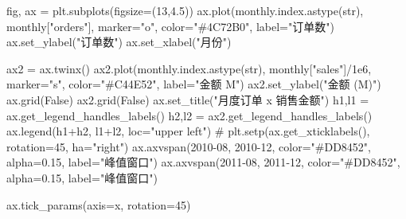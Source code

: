 \documentclass[
]{ctexart}
\newenvironment{Shaded}{\begin{snugshade}}{\end{snugshade}}
\newcommand{\BuiltInTok}[1]{\textcolor[rgb]{0.00,0.23,0.31}{#1}}
\newcommand{\CommentTok}[1]{\textcolor[rgb]{0.37,0.37,0.37}{#1}}
\newcommand{\DecValTok}[1]{\textcolor[rgb]{0.68,0.00,0.00}{#1}}
\newcommand{\FloatTok}[1]{\textcolor[rgb]{0.68,0.00,0.00}{#1}}
\newcommand{\NormalTok}[1]{\textcolor[rgb]{0.00,0.23,0.31}{#1}}
\newcommand{\OperatorTok}[1]{\textcolor[rgb]{0.37,0.37,0.37}{#1}}
\newcommand{\StringTok}[1]{\textcolor[rgb]{0.13,0.47,0.30}{#1}}
\newcommand{\VariableTok}[1]{\textcolor[rgb]{0.07,0.07,0.07}{#1}}
\begin{document}
\begin{Shaded}
\begin{Highlighting}[]
\NormalTok{fig, ax }\OperatorTok{=}\NormalTok{ plt.subplots(figsize}\OperatorTok{=}\NormalTok{(}\DecValTok{13}\NormalTok{,}\FloatTok{4.5}\NormalTok{))}
\NormalTok{ax.plot(monthly.index.astype(}\BuiltInTok{str}\NormalTok{), monthly[}\StringTok{"orders"}\NormalTok{], marker}\OperatorTok{=}\StringTok{"o"}\NormalTok{, color}\OperatorTok{=}\StringTok{"\#4C72B0"}\NormalTok{, label}\OperatorTok{=}\StringTok{"订单数"}\NormalTok{)}
\NormalTok{ax.set\_ylabel(}\StringTok{"订单数"}\NormalTok{)}
\NormalTok{ax.set\_xlabel(}\StringTok{"月份"}\NormalTok{)}

\NormalTok{ax2 }\OperatorTok{=}\NormalTok{ ax.twinx()}
\NormalTok{ax2.plot(monthly.index.astype(}\BuiltInTok{str}\NormalTok{), monthly[}\StringTok{"sales"}\NormalTok{]}\OperatorTok{/}\FloatTok{1e6}\NormalTok{, marker}\OperatorTok{=}\StringTok{"s"}\NormalTok{, color}\OperatorTok{=}\StringTok{"\#C44E52"}\NormalTok{, label}\OperatorTok{=}\StringTok{"金额 M"}\NormalTok{)}
\NormalTok{ax2.set\_ylabel(}\StringTok{"金额 (M)"}\NormalTok{)}
\NormalTok{ax.grid(}\VariableTok{False}\NormalTok{) }
\NormalTok{ax2.grid(}\VariableTok{False}\NormalTok{)}
\NormalTok{ax.set\_title(}\StringTok{"月度订单 x 销售金额"}\NormalTok{)}
\NormalTok{h1,l1 }\OperatorTok{=}\NormalTok{ ax.get\_legend\_handles\_labels()}
\NormalTok{h2,l2 }\OperatorTok{=}\NormalTok{ ax2.get\_legend\_handles\_labels()}
\NormalTok{ax.legend(h1}\OperatorTok{+}\NormalTok{h2, l1}\OperatorTok{+}\NormalTok{l2, loc}\OperatorTok{=}\StringTok{"upper left"}\NormalTok{)}
\CommentTok{\# plt.setp(ax.get\_xticklabels(), rotation=45, ha="right")}
\NormalTok{ax.axvspan(}\StringTok{\textquotesingle{}2010{-}08\textquotesingle{}}\NormalTok{, }\StringTok{\textquotesingle{}2010{-}12\textquotesingle{}}\NormalTok{, color}\OperatorTok{=}\StringTok{"\#DD8452"}\NormalTok{, alpha}\OperatorTok{=}\FloatTok{0.15}\NormalTok{, label}\OperatorTok{=}\StringTok{"峰值窗口"}\NormalTok{)}
\NormalTok{ax.axvspan(}\StringTok{\textquotesingle{}2011{-}08\textquotesingle{}}\NormalTok{, }\StringTok{\textquotesingle{}2011{-}12\textquotesingle{}}\NormalTok{, color}\OperatorTok{=}\StringTok{"\#DD8452"}\NormalTok{, alpha}\OperatorTok{=}\FloatTok{0.15}\NormalTok{, label}\OperatorTok{=}\StringTok{"峰值窗口"}\NormalTok{)}

\NormalTok{ax.tick\_params(axis}\OperatorTok{=}\StringTok{\textquotesingle{}x\textquotesingle{}}\NormalTok{, rotation}\OperatorTok{=}\DecValTok{45}\NormalTok{)}
\end{Highlighting}
\end{Shaded}
\end{document}
